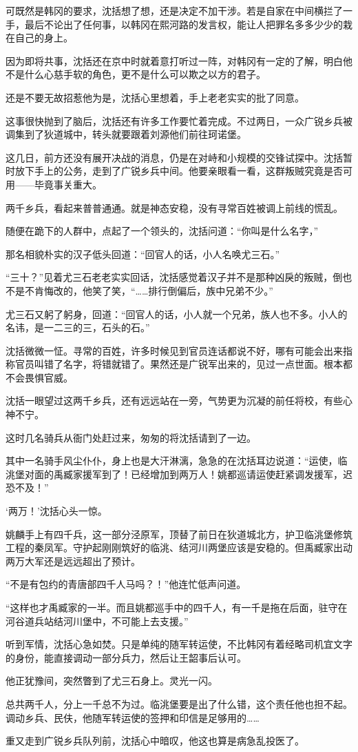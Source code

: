 可既然是韩冈的要求，沈括想了想，还是决定不加干涉。若是自家在中间横拦了一手，最后不论出了任何事，以韩冈在熙河路的发言权，能让人把罪名多多少少的栽在自己的身上。

因为即将共事，沈括还在京中时就着意打听过一阵，对韩冈有一定的了解，明白他不是什么心慈手软的角色，更不是什么可以欺之以方的君子。

还是不要无故招惹他为是，沈括心里想着，手上老老实实的批了同意。

这事很快抛到了脑后，沈括还有许多工作要忙着完成。不过两日，一众广锐乡兵被调集到了狄道城中，转头就要跟着刘源他们前往珂诺堡。

这几日，前方还没有展开决战的消息，仍是在对峙和小规模的交锋试探中。沈括暂时放下手上的公务，走到了广锐乡兵中间。他要亲眼看一看，这群叛贼究竟是否可用——毕竟事关重大。

两千乡兵，看起来普普通通。就是神态安稳，没有寻常百姓被调上前线的慌乱。

随便在跪下的人群中，点起了一个领头的，沈括问道：“你叫是什么名字，”

那名相貌朴实的汉子低头回道：“回官人的话，小人名唤尤三石。”

“三十？”见着尤三石老老实实回话，沈括感觉着汉子并不是那种凶戾的叛贼，倒也不是不肯悔改的，他笑了笑，“……排行倒偏后，族中兄弟不少。”

尤三石又躬了躬身，回道：“回官人的话，小人就一个兄弟，族人也不多。小人的名讳，是一二三的三，石头的石。”

沈括微微一怔。寻常的百姓，许多时候见到官员连话都说不好，哪有可能会出来指称官员叫错了名字，将错就错了。果然还是广锐军出来的，见过一点世面。根本都不会畏惧官威。

沈括一眼望过这两千乡兵，还有远远站在一旁，气势更为沉凝的前任将校，有些心神不宁。

这时几名骑兵从衙门处赶过来，匆匆的将沈括请到了一边。

其中一名骑手风尘仆仆，身上也是大汗淋漓，急急的在沈括耳边说道：“运使，临洮堡对面的禹臧家援军到了！已经增加到两万人！姚都巡请运使赶紧调发援军，迟恐不及！”

‘两万！’沈括心头一惊。

姚麟手上有四千兵，这一部分泾原军，顶替了前日在狄道城北方，护卫临洮堡修筑工程的秦凤军。守护起刚刚筑好的临洮、结河川两堡应该是安稳的。但禹臧家出动两万大军还是远远超出了预计。

“不是有包约的青唐部四千人马吗？！”他连忙低声问道。

“这样也才禹臧家的一半。而且姚都巡手中的四千人，有一千是拖在后面，驻守在河谷道兵站结河川堡中，不可能上去支援。”

听到军情，沈括心急如焚。只是单纯的随军转运使，不比韩冈有着经略司机宜文字的身份，能直接调动一部分兵力，然后让王韶事后认可。

他正犹豫间，突然瞥到了尤三石身上。灵光一闪。

总共两千人，分上一千总不为过。临洮堡要是出了什么错，这个责任他也担不起。调动乡兵、民伕，他随军转运使的签押和印信是足够用的……

重又走到广锐乡兵队列前，沈括心中暗叹，他这也算是病急乱投医了。

